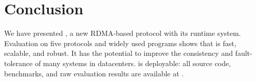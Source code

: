 \section{Conclusion}\label{sec:conclusion}

We have presented \xxx, a new RDMA-based \paxos protocol with its runtime 
system. Evaluation on five \paxos protocols and widely used programs 
shows that \xxx is fast, scalable, and robust. It has the potential to improve 
the consistency and fault-tolerance of many systems in datacenters. \xxx is 
deployable: all source code, benchmarks, and raw evaluation results are 
available at \github.
